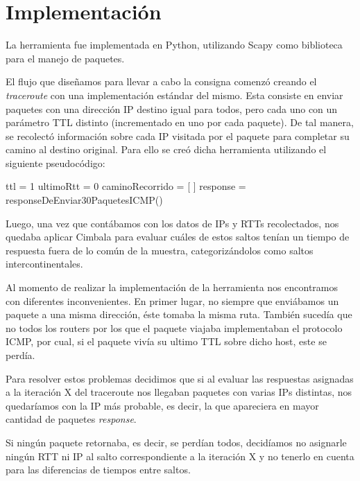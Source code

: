 \documentclass[a4paper,10pt]{article}
\begin{document}
\section{Implementación}
\par{La herramienta fue implementada en Python, utilizando Scapy como biblioteca para el manejo de paquetes.  }
\par{El flujo que diseñamos para llevar a cabo la consigna comenzó creando el \textit{traceroute} con una implementación estándar del mismo. Esta consiste en enviar paquetes con una dirección IP destino igual para todos, pero cada uno con un parámetro TTL distinto (incrementado en uno por cada paquete). De tal manera, se recolectó información sobre cada IP visitada por el paquete para completar su camino al destino original. Para ello se creó dicha herramienta utilizando el siguiente pseudocódigo:}

\medskip
\medskip
\begin{algorithm}[H]
 ttl  = 1 \;
 ultimoRtt = 0\; 
 caminoRecorrido = [ ]\;
 response = responseDeEnviar30PaquetesICMP()\;
    
\end{algorithm}


\medskip
\par{Luego, una vez que contábamos con los datos de IPs y RTTs recolectados, nos quedaba aplicar Cimbala para evaluar cuáles de estos saltos tenían un tiempo de respuesta fuera de lo común de la muestra, categorizándolos como saltos intercontinentales.}

\medskip
\par{Al momento de realizar la implementación de la herramienta nos encontramos con diferentes inconvenientes. En primer lugar, no siempre que enviábamos un paquete a una misma dirección, éste tomaba la misma ruta. También sucedía que no todos los routers por los que el paquete viajaba implementaban el protocolo ICMP, por cual, si el paquete vivía su ultimo TTL sobre dicho host, este se perdía.}

\medskip
\par{Para resolver estos problemas decidimos que si al evaluar las respuestas asignadas a la iteración X del traceroute nos llegaban paquetes con varias IPs distintas, nos quedaríamos con la IP más probable, es decir, la que apareciera en mayor cantidad de paquetes \textit{response}.}
\par{Si ningún paquete retornaba, es decir, se perdían todos, decidíamos no asignarle ningún RTT ni IP al salto correspondiente a la iteración X y no tenerlo en cuenta para las diferencias de tiempos entre saltos.}
\end{document}

